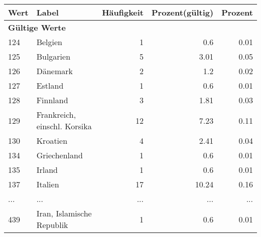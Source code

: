      \begin{longtable}{lXrrr}
     \toprule
     \textbf{Wert} & \textbf{Label} & \textbf{Häufigkeit} & \textbf{Prozent(gültig)} & \textbf{Prozent} \\
     \endhead
     \midrule
     \multicolumn{5}{l}{\textbf{Gültige Werte}}\\
        124 & \multicolumn{1}{X}{Belgien} & %
          \num{1} &
          \num[round-mode=places,round-precision=2]{0,6} &
          \num[round-mode=places,round-precision=2]{0,01} \\
        125 & \multicolumn{1}{X}{Bulgarien} & %
          \num{5} &
          \num[round-mode=places,round-precision=2]{3,01} &
          \num[round-mode=places,round-precision=2]{0,05} \\
        126 & \multicolumn{1}{X}{Dänemark} & %
          \num{2} &
          \num[round-mode=places,round-precision=2]{1,2} &
          \num[round-mode=places,round-precision=2]{0,02} \\
        127 & \multicolumn{1}{X}{Estland} & %
          \num{1} &
          \num[round-mode=places,round-precision=2]{0,6} &
          \num[round-mode=places,round-precision=2]{0,01} \\
        128 & \multicolumn{1}{X}{Finnland} & %
          \num{3} &
          \num[round-mode=places,round-precision=2]{1,81} &
          \num[round-mode=places,round-precision=2]{0,03} \\
        129 & \multicolumn{1}{X}{Frankreich, einschl. Korsika} & %
          \num{12} &
          \num[round-mode=places,round-precision=2]{7,23} &
          \num[round-mode=places,round-precision=2]{0,11} \\
        130 & \multicolumn{1}{X}{Kroatien} & %
          \num{4} &
          \num[round-mode=places,round-precision=2]{2,41} &
          \num[round-mode=places,round-precision=2]{0,04} \\
        134 & \multicolumn{1}{X}{Griechenland} & %
          \num{1} &
          \num[round-mode=places,round-precision=2]{0,6} &
          \num[round-mode=places,round-precision=2]{0,01} \\
        135 & \multicolumn{1}{X}{Irland} & %
          \num{1} &
          \num[round-mode=places,round-precision=2]{0,6} &
          \num[round-mode=places,round-precision=2]{0,01} \\
        137 & \multicolumn{1}{X}{Italien} & %
          \num{17} &
          \num[round-mode=places,round-precision=2]{10,24} &
          \num[round-mode=places,round-precision=2]{0,16} \\
       ... & ... & ... & ... & ... \\
        439 & \multicolumn{1}{X}{Iran, Islamische Republik} & %
          \num{1} &
          \num[round-mode=places,round-precision=2]{0,6} &
          \num[round-mode=places,round-precision=2]{0,01} \\


\end{longtable}
